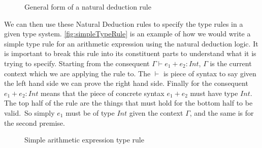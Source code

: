 \begin{figure}[tbp]
    \begin{prooftree}
    \end{prooftree}
    \caption{General form of a natural deduction rule}
    \label{fig:generalNatDectRule}
\end{figure}

We can then use these Natural Deduction rules to specify the type rules in a given type system\cite{ranta2012implementing,cardelli1996type,}.
\autoref{fig:simpleTypeRule} is an example of how we would write a simple type rule for an arithmetic expression using the natural deduction logic.
It is important to break this rule into its constituent parts to understand what it is trying to specify.
Starting from the consequent $\Gamma \vdash e_1 + e_2 : Int$, $\Gamma$ is the current context which we are applying the rule to.
The $\vdash$ is piece of syntax to say given the left hand side we can prove the right hand side.
Finally for the consequent $e_1 + e_2 : Int$ means that the piece of concrete syntax $e_1 + e_2$ must have type $Int$.
The top half of the rule are the things that must hold for the bottom half to be valid.\
So simply $e_1$ must be of type $Int$ given the context $\Gamma$, and the same is for the second premise\cite{cardelli1996type,ranta2012implementing}.

\begin{figure}[tbp]
    \begin{prooftree}
    \end{prooftree}
    \caption{Simple arithmetic expression type rule}
    \label{fig:simpleTypeRule}
\end{figure}